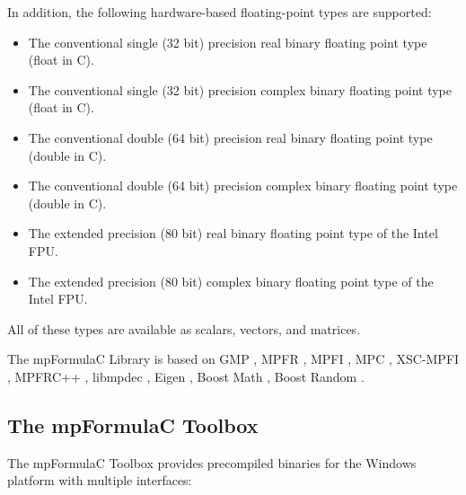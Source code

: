In addition, the following hardware-based floating-point types are supported:

\begin{itemize}		
	\item The conventional single (32 bit) precision real binary floating point type (float in C).
	\item The conventional single (32 bit) precision complex binary floating point type (float in C).	
	\item The conventional double (64 bit) precision real binary floating point type (double in C).
	\item The conventional double (64 bit) precision complex binary floating point type (double in C).	
	\item The extended precision (80 bit) real binary floating point type of the Intel FPU.
	\item The extended precision (80 bit) complex binary floating point type of the Intel FPU.	
\end{itemize}


All of these types are available as scalars, vectors, and matrices.

\vpara
The mpFormulaC Library is based on GMP \citep{Granlund12}, MPFR \citep{MPFR_2007}, MPFI  \citep{MPFI_2005}, MPC \citep{mpc_2012}, XSC-MPFI \citep{Blomquist2012}, MPFRC++ \citep{Holoborodko2012}, libmpdec \citep{mpd_2012}, Eigen \citep{Guennebaud2010}, Boost Math \citep{boost_math}, Boost Random \citep{boost_random}.



	
\subsection{The mpFormulaC Toolbox}	
The mpFormulaC Toolbox provides precompiled binaries for the Windows platform with multiple interfaces:

